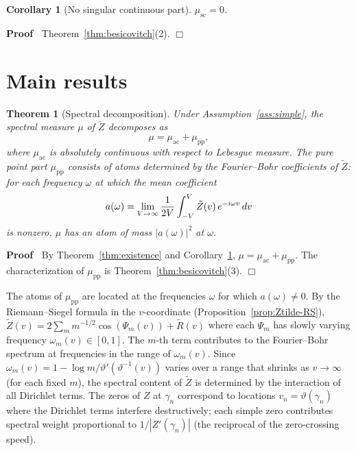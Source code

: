 \documentclass{article}
\newenvironment{proof}{\noindent\textbf{Proof\ }}{\hspace*{\fill}$\Box$\medskip}
\newtheorem{corollary}{Corollary}
\newtheorem{theorem}{Theorem}
\begin{document}
\begin{corollary}
  [No singular continuous part]\label{cor:no-sc} $\mu_{\mathrm{sc}} = 0$.
\end{corollary}

\begin{proof}
  Theorem~\ref{thm:besicovitch}(2).
\end{proof}

\section{Main results}\label{sec:main}

\begin{theorem}
  [Spectral decomposition]\label{thm:I} Under Assumption~\ref{ass:simple}, the
  spectral measure $\mu$ of $\tilde{Z}$ decomposes as
  \[ \mu = \mu_{\mathrm{ac}} + \mu_{\mathrm{pp}}, \]
  where $\mu_{\mathrm{ac}}$ is absolutely continuous with respect to Lebesgue
  measure. The pure point part $\mu_{\mathrm{pp}}$ consists of atoms
  determined by the Fourier--Bohr coefficients of $\tilde{Z}$: for each
  frequency $\omega$ at which the mean coefficient
  \[ a (\omega) = \lim_{V \to \infty}  \frac{1}{2 V}  \int_{- V}^V \tilde{Z}
     (v)  \hspace{0.17em} e^{- i \omega v}  \hspace{0.17em} dv \]
  is nonzero, $\mu$ has an atom of mass $|a (\omega) |^2$ at $\omega$.
\end{theorem}

\begin{proof}
  By Theorem~\ref{thm:existence} and Corollary~\ref{cor:no-sc}, $\mu =
  \mu_{\mathrm{ac}} + \mu_{\mathrm{pp}}$. The characterization of
  $\mu_{\mathrm{pp}}$ is Theorem~\ref{thm:besicovitch}(3).
\end{proof}

\begin{remark}
  \label{rem:atoms} The atoms of
  $\mu_{\mathrm{pp}}$ are located at the frequencies $\omega$ for which $a
  (\omega) \ne 0$. By the Riemann--Siegel formula in the $v$-coordinate
  (Proposition~\ref{prop:Ztilde-RS}), $\tilde{Z} (v) = 2 \sum_m m^{- 1 / 2}
  \cos (\Psi_m (v)) + \tilde{R} (v)$ where each $\Psi_m$ has slowly varying
  frequency $\omega_m (v) \in [0, 1]$. The $m$-th term contributes to the
  Fourier--Bohr spectrum at frequencies in the range of $\omega_m (v)$. Since
  $\omega_m (v) = 1 - \log m / \vartheta' (\vartheta^{- 1} (v))$ varies over a
  range that shrinks as $v \to \infty$ (for each fixed $m$), the spectral
  content of $\tilde{Z}$ is determined by the interaction of all Dirichlet
  terms. The zeros of $Z$ at $\gamma_n$ correspond to locations $v_n =
  \vartheta (\gamma_n)$ where the Dirichlet terms interfere destructively;
  each simple zero contributes spectral weight proportional to $1 / |Z'
  (\gamma_n) |$ (the reciprocal of the zero-crossing speed).
\end{remark}
\end{document}
